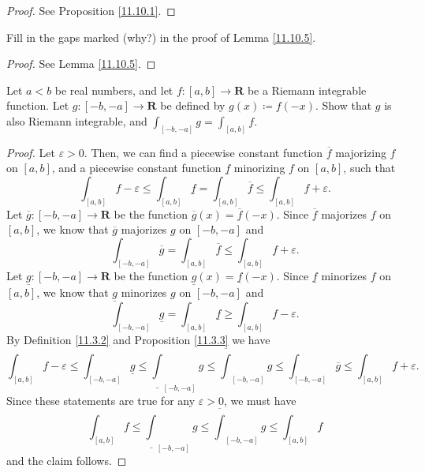 \begin{proof}
    See Proposition \ref{11.10.1}.
\end{proof}

\begin{exercise}\label{ex 11.10.2}
    Fill in the gaps marked (why?) in the proof of Lemma \ref{11.10.5}.
\end{exercise}

\begin{proof}
    See Lemma \ref{11.10.5}.
\end{proof}

\begin{exercise}\label{ex 11.10.3}
    Let \(a < b\) be real numbers, and let \(f : [a, b] \to \mathbf{R}\) be a Riemann integrable function.
    Let \(g : [-b, -a] \to \mathbf{R}\) be defined by \(g(x) \coloneqq f(-x)\).
    Show that \(g\) is also Riemann integrable, and \(\int_{[-b, -a]} g = \int_{[a, b]} f\).
\end{exercise}

\begin{proof}
    Let \(\varepsilon > 0\).
    Then, we can find a piecewise constant function \(\overline{f}\) majorizing \(f\) on \([a, b]\), and a piecewise constant function \(\underline{f}\) minorizing \(f\) on \([a, b]\), such that
    \[
        \int_{[a, b]} f - \varepsilon \leq \int_{[a, b]} \underline{f} = \int_{[a, b]} \overline{f} \leq \int_{[a, b]} f + \varepsilon.
    \]
    Let \(\overline{g} : [-b, -a] \to \mathbf{R}\) be the function \(\overline{g}(x) = \overline{f}(-x)\).
    Since \(\overline{f}\) majorizes \(f\) on \([a, b]\), we know that \(\overline{g}\) majorizes \(g\) on \([-b, -a]\) and
    \[
        \int_{[-b, -a]} \overline{g} = \int_{[a, b]} \overline{f} \leq \int_{[a, b]} f + \varepsilon.
    \]
    Let \(\underline{g} : [-b, -a] \to \mathbf{R}\) be the function \(\underline{g}(x) = \underline{f}(-x)\).
    Since \(\underline{f}\) minorizes \(f\) on \([a, b]\), we know that \(\underline{g}\) minorizes \(g\) on \([-b, -a]\) and
    \[
        \int_{[-b, -a]} \underline{g} = \int_{[a, b]} \underline{f} \geq \int_{[a, b]} f - \varepsilon.
    \]
    By Definition \ref{11.3.2} and Proposition \ref{11.3.3} we have
    \[
        \int_{[a, b]} f - \varepsilon \leq \int_{[-b, -a]} \underline{g} \leq \underline{\int}_{[-b, -a]} g \leq \overline{\int}_{[-b, -a]} g \leq \int_{[-b, -a]} \overline{g} \leq \int_{[a, b]} f + \varepsilon.
    \]
    Since these statements are true for any \(\varepsilon > 0\), we must have
    \[
        \int_{[a, b]} f \leq \underline{\int}_{[-b, -a]} g \leq \overline{\int}_{[-b, -a]} g \leq \int_{[a, b]} f
    \]
    and the claim follows.
\end{proof}

